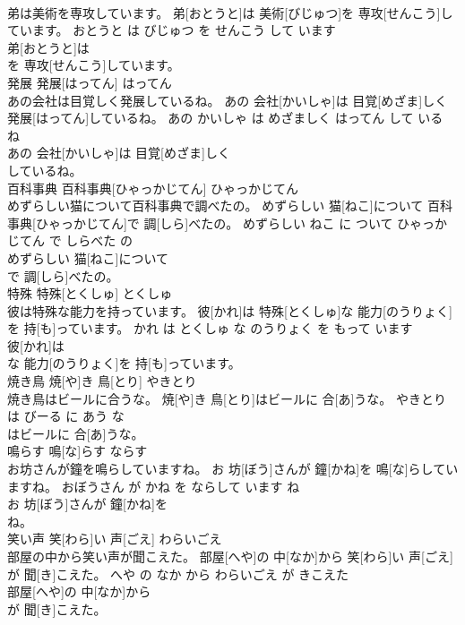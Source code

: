 \documentclass[8pt]{extreport}
\begin{document}
\begin{CJK}{UTF8}{min}
\\	弟は美術を専攻しています。	弟[おとうと]は 美術[びじゅつ]を 専攻[せんこう]しています。	おとうと は びじゅつ を せんこう して います	
\\	弟[おとうと]は
\\	を 専攻[せんこう]しています。			
\\	発展	発展[はってん]	はってん	
\\	あの会社は目覚しく発展しているね。	あの 会社[かいしゃ]は 目覚[めざま]しく 発展[はってん]しているね。	あの かいしゃ は めざましく はってん して いる ね	
\\	あの 会社[かいしゃ]は 目覚[めざま]しく
\\	しているね。			
\\	百科事典	百科事典[ひゃっかじてん]	ひゃっかじてん	
\\	めずらしい猫について百科事典で調べたの。	めずらしい 猫[ねこ]について 百科事典[ひゃっかじてん]で 調[しら]べたの。	めずらしい ねこ に ついて ひゃっかじてん で しらべた の	
\\	めずらしい 猫[ねこ]について
\\	で 調[しら]べたの。			
\\	特殊	特殊[とくしゅ]	とくしゅ	
\\	彼は特殊な能力を持っています。	彼[かれ]は 特殊[とくしゅ]な 能力[のうりょく]を 持[も]っています。	かれ は とくしゅ な のうりょく を もって います	
\\	彼[かれ]は
\\	な 能力[のうりょく]を 持[も]っています。			
\\	焼き鳥	焼[や]き 鳥[とり]	やきとり	
\\	焼き鳥はビールに合うな。	焼[や]き 鳥[とり]はビールに 合[あ]うな。	やきとり は びーる に あう な	
\\	はビールに 合[あ]うな。			
\\	鳴らす	鳴[な]らす	ならす	
\\	お坊さんが鐘を鳴らしていますね。	お 坊[ぼう]さんが 鐘[かね]を 鳴[な]らしていますね。	おぼうさん が かね を ならして います ね	
\\	お 坊[ぼう]さんが 鐘[かね]を
\\	ね。			
\\	笑い声	笑[わら]い 声[ごえ]	わらいごえ	
\\	部屋の中から笑い声が聞こえた。	部屋[へや]の 中[なか]から 笑[わら]い 声[ごえ]が 聞[き]こえた。	へや の なか から わらいごえ が きこえた	
\\	部屋[へや]の 中[なか]から
\\	が 聞[き]こえた。			

\end{CJK}
\end{document}
